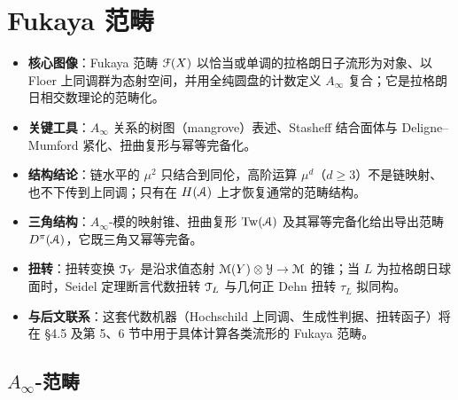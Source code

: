 \documentclass[11pt,a4paper]{article}
\numberwithin{equation}{section}
\newcommand{\scrA}{\EuScript{A}}
\newcommand{\scrT}{\EuScript{T}}
\newcommand{\scrY}{\EuScript{Y}}
\newcommand{\scrM}{\EuScript{M}}
\newcommand{\scrF}{\EuScript{F}}
\newcommand{\Tw}{\operatorname{Tw}}
\begin{document}
\section{Fukaya 范畴}\label{Sec:Fukaya}

\begin{keypoints}
\begin{itemize}
  \item \textbf{核心图像}：Fukaya 范畴 $\scrF(X)$ 以恰当或单调的拉格朗日子流形为对象、以 Floer 上同调群为态射空间，并用全纯圆盘的计数定义 $A_{\infty}$ 复合；它是拉格朗日相交数理论的范畴化。
  \item \textbf{关键工具}：$A_{\infty}$ 关系的树图（mangrove）表述、Stasheff 结合面体与 Deligne--Mumford 紧化、扭曲复形与幂等完备化。
  \item \textbf{结构结论}：链水平的 $\mu^2$ 只结合到同伦，高阶运算 $\mu^d$（$d\ge 3$）不是链映射、也不下传到上同调；只有在 $H(\scrA)$ 上才恢复通常的范畴结构。
  \item \textbf{三角结构}：$A_{\infty}$-模的映射锥、扭曲复形 $\Tw(\scrA)$ 及其幂等完备化给出导出范畴 $D^\pi(\scrA)$，它既三角又幂等完备。
  \item \textbf{扭转}：扭转变换 $\scrT_Y$ 是沿求值态射 $\scrM(Y)\otimes\scrY\to\scrM$ 的锥；当 $L$ 为拉格朗日球面时，Seidel 定理断言代数扭转 $\scrT_L$ 与几何正 Dehn 扭转 $\tau_L$ 拟同构。
  \item \textbf{与后文联系}：这套代数机器（Hochschild 上同调、生成性判据、扭转函子）将在 §4.5 及第 5、6 节中用于具体计算各类流形的 Fukaya 范畴。
\end{itemize}
\end{keypoints}

\subsection{$A_{\infty}$-范畴}
\end{document}

